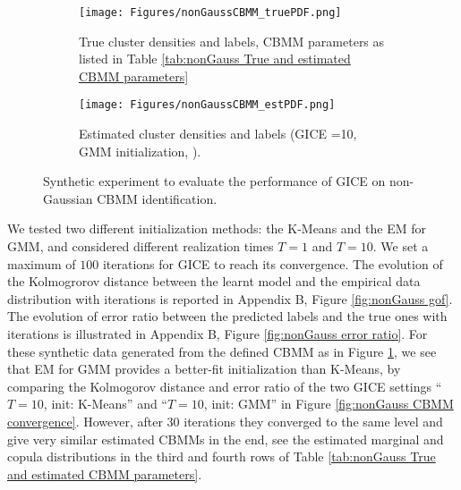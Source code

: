 \begin{figure}[tb]
\centering
\begin{subfigure}[t]{0.49\textwidth}
  \centering
  \texttt{[image: Figures/nonGaussCBMM\_truePDF.png]}
  \captionsetup{width=.9\linewidth}
  \caption{True cluster densities and labels, CBMM parameters as listed in Table \ref{tab:nonGauss True and estimated CBMM parameters}}
  \label{fig:nonGauss True PDF and labels}
\end{subfigure}%
\begin{subfigure}[t]{0.49\textwidth} 
  \centering
  \texttt{[image: Figures/nonGaussCBMM\_estPDF.png]}
  \captionsetup{width=.95\linewidth}
  \caption{Estimated cluster densities and labels (GICE =10, GMM initialization, ).}
  \label{fig:nonGauss Estimated PDF and labels}
\end{subfigure}
\caption{Synthetic experiment  to evaluate the performance of GICE on non-Gaussian CBMM identification.}
\label{fig:nonGauss CBMM PDF and labels}
\end{figure}



We tested two different initialization methods: the K-Means and the EM for GMM, and considered different realization times $T=1$ and $T=10$. 
We set a maximum of $100$ iterations for GICE to reach its convergence. The evolution of the Kolmogrorov distance between the learnt model and the empirical data distribution  with iterations is reported in 
Appendix B, Figure \ref{fig:nonGauss gof}. 
The evolution of error ratio between the predicted labels and the true ones with iterations is illustrated in 
Appendix B, Figure \ref{fig:nonGauss error ratio}. 
For these synthetic data generated from the defined CBMM as in Figure \ref{fig:nonGauss True PDF and labels}, we see that EM for GMM provides a better-fit initialization than K-Means, by comparing the 
Kolmogorov distance and error ratio of the two GICE settings ``$T=10$, init: K-Means'' and ``$T=10$, init: GMM'' 
in Figure \ref{fig:nonGauss CBMM convergence}. However, after 30 iterations they converged to the same level and give very similar estimated CBMMs in the end, see the estimated marginal and copula distributions in 
the third and fourth rows of Table \ref{tab:nonGauss True and estimated CBMM parameters}. 

